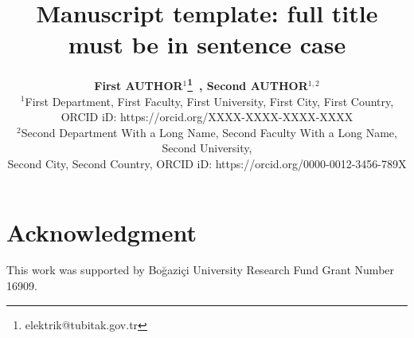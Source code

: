 \documentclass{elektr}
\title{Manuscript template: full title must be in sentence case}
\author[AUTHOR and AUTHOR]{
\textbf{First AUTHOR$^{1}$\thanks{elektrik@tubitak.gov.tr}~, Second AUTHOR$^{1,2}$}\\
$^{1}$First Department, First Faculty, First University, First City, First Country, \\ ORCID iD: https://orcid.org/XXXX-XXXX-XXXX-XXXX\\
$^{2}$Second Department With a Long Name, Second Faculty With a Long Name, Second University,\\ Second City, Second Country, ORCID iD: https://orcid.org/0000-0012-3456-789X
\\ [1.8em]

\rec{.202}
\acc{.202}
\finv{..202}
}
\begin{document}
\maketitle












\section*{Acknowledgment}
This work was supported by Boğaziçi University Research Fund Grant Number 16909.


\end{document}
